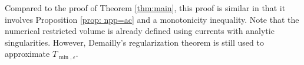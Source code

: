\documentclass[a4paper]{amsart}
\renewcommand{\epsilon}{\varepsilon}
\theoremstyle{definition}
\begin{document}
Compared to the proof of Theorem \ref{thm:main}, this proof is similar in that it involves Proposition \ref{prop: npp=ac} and a monotonicity inequality. Note that the numerical restricted volume is already defined using currents with analytic singularities. However, Demailly's regularization theorem is still used to approximate $T_{\min, \epsilon}$. 


\end{document}
